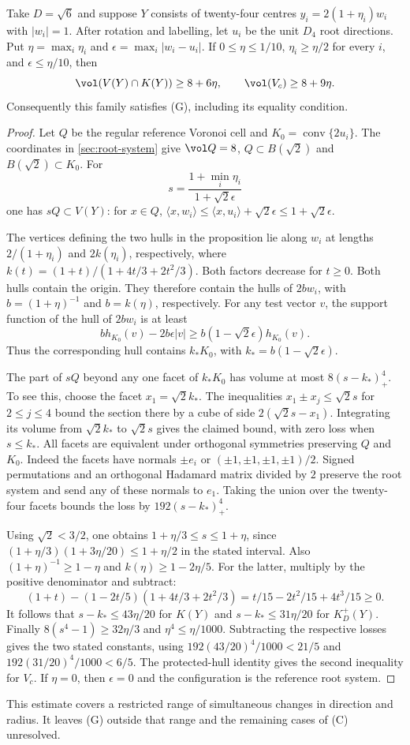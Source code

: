 \begin{prop}\label{prop:protected-tilt}
Take $D=\sqrt6$ and suppose $Y$ consists of twenty-four centres
$y_i=2(1+\eta_i)w_i$ with $|w_i|=1$. After rotation and labelling,
let $u_i$ be the unit $D_4$ root directions. Put
$\eta=\max_i\eta_i$ and $\epsilon=\max_i|w_i-u_i|$.
If $0\le\eta\le1/10$, $\eta_i\ge\eta/2$ for every $i$, and
$\epsilon\le\eta/10$, then
\[
 \vol(V(Y)\cap K(Y))\ge 8+6\eta,
 \qquad \vol(V_c)\ge8+9\eta.
\]
Consequently this family satisfies (G), including its equality condition.
\end{prop}
\begin{proof}
Let $Q$ be the regular reference Voronoi cell and
$K_0=\operatorname{conv}\{2u_i\}$. The coordinates in
\cref{sec:root-system} give $\vol Q=8$, $Q\subset B(\sqrt2)$
and $B(\sqrt2)\subset K_0$. For
\[
 s=\frac{1+\min_i\eta_i}{1+\sqrt2\epsilon}
\]
one has $sQ\subset V(Y)$: for $x\in Q$,
$\langle x,w_i\rangle\le\langle x,u_i\rangle+\sqrt2\epsilon
\le1+\sqrt2\epsilon$.

The vertices defining the two hulls in the proposition lie along
$w_i$ at lengths $2/(1+\eta_i)$ and $2k(\eta_i)$, respectively,
where $k(t)=(1+t)/(1+4t/3+2t^2/3)$. Both factors decrease for
$t\ge0$. Both hulls contain the origin. They therefore contain
the hulls of $2b w_i$, with $b=(1+\eta)^{-1}$ and $b=k(\eta)$,
respectively. For any test vector $v$, the support function of
the hull of $2b w_i$ is at least
\[
 b h_{K_0}(v)-2b\epsilon |v|
 \ge b(1-\sqrt2\epsilon)h_{K_0}(v).
\]
Thus the corresponding hull contains $k_*K_0$, with
$k_*=b(1-\sqrt2\epsilon)$.

The part of $sQ$ beyond any one facet of $k_*K_0$ has volume at
most $8(s-k_*)_+^4$. To see this, choose the facet $x_1=\sqrt2 k_*$.
The inequalities $x_1\pm x_j\le\sqrt2 s$ for $2\le j\le4$
bound the section there by a cube of side $2(\sqrt2 s-x_1)$.
Integrating its volume from $\sqrt2 k_*$ to $\sqrt2 s$ gives the
claimed bound, with zero loss when $s\le k_*$. All facets are
equivalent under orthogonal symmetries preserving $Q$ and $K_0$.
Indeed the facets have normals $\pm e_i$ or
$(\pm1,\pm1,\pm1,\pm1)/2$. Signed permutations and an orthogonal
Hadamard matrix divided by $2$ preserve the root system and send
any of these normals to $e_1$. Taking the union over the twenty-four
facets bounds the loss by $192(s-k_*)_+^4$.

Using $\sqrt2<3/2$, one obtains $1+\eta/3\le s\le1+\eta$,
since $(1+\eta/3)(1+3\eta/20)\le1+\eta/2$ in the stated interval.
Also $(1+\eta)^{-1}\ge1-\eta$ and $k(\eta)\ge1-2\eta/5$.
For the latter, multiply by the positive denominator and subtract:
\[
 (1+t)-(1-2t/5)(1+4t/3+2t^2/3)
 =t/15-2t^2/15+4t^3/15\ge0.
\]
It follows that $s-k_*\le43\eta/20$ for $K(Y)$ and
$s-k_*\le31\eta/20$ for $K_D^+(Y)$. Finally
$8(s^4-1)\ge32\eta/3$ and $\eta^4\le\eta/1000$.
Subtracting the respective losses gives the two stated constants,
using $192(43/20)^4/1000<21/5$ and
$192(31/20)^4/1000<6/5$. The protected-hull identity gives the
second inequality for $V_c$. If $\eta=0$, then $\epsilon=0$ and
the configuration is the reference root system.
\end{proof}

This estimate covers a restricted range of simultaneous changes in
direction and radius. It leaves (G) outside that range and the
remaining cases of (C) unresolved.
